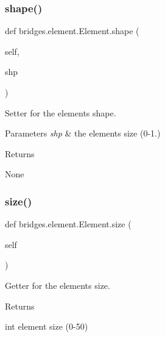 \subsubsection{\texorpdfstring{shape()}{shape()}\hspace{0.1cm}{\footnotesize\ttfamily [2/2]}}
{\footnotesize\ttfamily def bridges.\+element.\+Element.\+shape (\begin{DoxyParamCaption}\item[{}]{self,  }\item[{}]{shp }\end{DoxyParamCaption})}



Setter for the element\textquotesingle{}s shape. 


\begin{DoxyParams}{Parameters}
{\em shp} & the element\textquotesingle{}s size (0-\/1.) \\
\hline
\end{DoxyParams}
\begin{DoxyReturn}{Returns}


None 
\end{DoxyReturn}
\mbox{\label{classbridges_1_1element_1_1_element_a4d25b09a11a282c8c8147b16cd45c5bf}} 
\subsubsection{\texorpdfstring{size()}{size()}\hspace{0.1cm}{\footnotesize\ttfamily [1/2]}}
{\footnotesize\ttfamily def bridges.\+element.\+Element.\+size (\begin{DoxyParamCaption}\item[{}]{self }\end{DoxyParamCaption})}



Getter for the element\textquotesingle{}s size. 

\begin{DoxyReturn}{Returns}


int element size (0-\/50) 
\end{DoxyReturn}
\mbox{\label{classbridges_1_1element_1_1_element_afbb37ab4474c2ac1b7da950fb06819ed}} 
